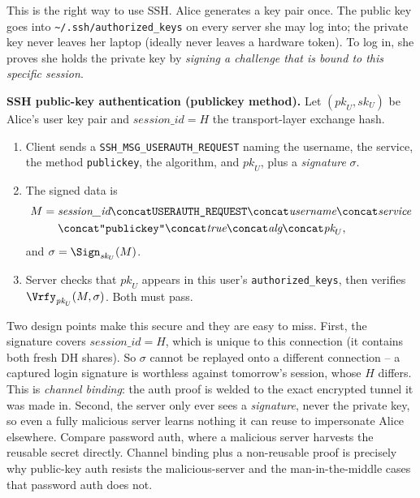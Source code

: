 This is the right way to use SSH. Alice generates a key pair once. The public key goes into \texttt{\textasciitilde/.ssh/authorized\_keys} on every server she may log into; the private key never leaves her laptop (ideally never leaves a hardware token). To log in, she proves she holds the private key by \emph{signing a challenge that is bound to this specific session}.

\begin{formalbox}
\textbf{SSH public-key authentication (publickey method).} Let $(\textit{pk}_U,\textit{sk}_U)$ be Alice's user key pair and $\textit{session\_id} = H$ the transport-layer exchange hash.
\begin{enumerate}
  \item Client sends a \texttt{SSH\_MSG\_USERAUTH\_REQUEST} naming the username, the service, the method \texttt{publickey}, the algorithm, and $\textit{pk}_U$, plus a \emph{signature} $\sigma$.
  \item The signed data is
  \[
    \begin{aligned}
    M = \;&\textit{session\_id} \concat \texttt{USERAUTH\_REQUEST} \concat \textit{username} \concat \textit{service} \\
          &\concat \texttt{"publickey"} \concat \textit{true} \concat \textit{alg} \concat \textit{pk}_U,
    \end{aligned}
  \]
  and $\sigma = \Sign_{\textit{sk}_U}(M)$.
  \item Server checks that $\textit{pk}_U$ appears in this user's \texttt{authorized\_keys}, then verifies $\Vrfy_{\textit{pk}_U}(M,\sigma)$. Both must pass.
\end{enumerate}
\end{formalbox}

\begin{whybox}
Two design points make this secure and they are easy to miss. First, the signature covers $\textit{session\_id} = H$, which is unique to this connection (it contains both fresh DH shares). So $\sigma$ cannot be replayed onto a different connection -- a captured login signature is worthless against tomorrow's session, whose $H$ differs. This is \emph{channel binding}: the auth proof is welded to the exact encrypted tunnel it was made in. Second, the server only ever sees a \emph{signature}, never the private key, so even a fully malicious server learns nothing it can reuse to impersonate Alice elsewhere. Compare password auth, where a malicious server harvests the reusable secret directly. Channel binding plus a non-reusable proof is precisely why public-key auth resists the malicious-server and the man-in-the-middle cases that password auth does not.
\end{whybox}

